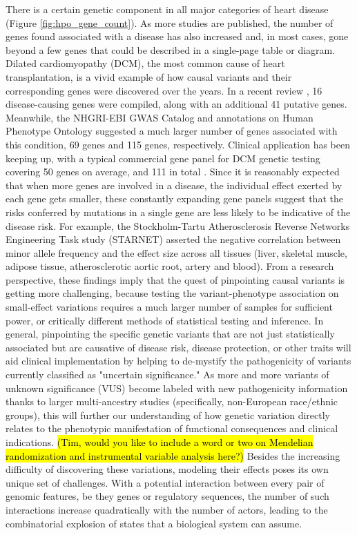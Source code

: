 \documentclass[letter]{bioinfo}
\begin{document}
There is a certain genetic component in all major categories of heart disease (Figure \ref{fig:hpo_gene_count}).  As more studies are published, the number of genes found associated with a disease has also increased and, in most cases, gone beyond a few genes that could be described in a single-page table or diagram.  Dilated cardiomyopathy (DCM), the most common cause of heart transplantation, is a vivid example of how causal variants and their corresponding genes were discovered over the years.  In a recent review \citep{Burke:2016:Clinical}, 16 disease-causing genes were compiled, along with an additional 41 putative genes.  Meanwhile, the NHGRI-EBI GWAS Catalog \citep{MacArthur:2017:new} and annotations on Human Phenotype Ontology \citep{Kohler:2017:Human} suggested a much larger number of genes associated with this condition, 69 genes and 115 genes, respectively.  Clinical application has been keeping up, with a typical commercial gene panel for DCM genetic testing covering 50 genes on average, and 111 in total \citep{McNally:2017:Dilated}.  Since it is reasonably expected that when more genes are involved in a disease, the individual effect exerted by each gene gets smaller, these constantly expanding gene panels suggest that the risks conferred by mutations in a single gene are less likely to be indicative of the disease risk.  For example, the Stockholm-Tartu Atherosclerosis Reverse Networks Engineering Task study (STARNET) \citep{Franzen:2016:Cardiometabolic} asserted the negative correlation between minor allele frequency and the effect size across all tissues (liver, skeletal muscle, adipose tissue, atherosclerotic aortic root, artery and blood).  From a research perspective, these findings imply that the quest of pinpointing causal variants is getting more challenging, because testing the variant-phenotype association on small-effect variations requires a much larger number of samples for sufficient power, or critically different methods of statistical testing and inference. In general, pinpointing the specific genetic variants that are not just statistically associated but are causative of disease risk, disease protection, or other traits will aid clinical implementation by helping to de-mystify the pathogenicity of variants currently classified as "uncertain significance."  As more and more variants of unknown significance (VUS) become labeled with new pathogenicity information thanks to larger multi-ancestry studies (specifically, non-European race/ethnic groups), this will further our understanding of how genetic variation directly relates to the phenotypic manifestation of functional consequences and clinical indications.  \hl{(Tim, would you like to include a word or two on Mendelian randomization and instrumental variable analysis here?)}  Besides the increasing difficulty of discovering these variations, modeling their effects poses its own unique set of challenges. With a potential interaction between every pair of genomic features, be they genes or regulatory sequences, the number of such interactions increase quadratically with the number of actors, leading to the combinatorial explosion of states that a biological system can assume.
	
\end{document}

